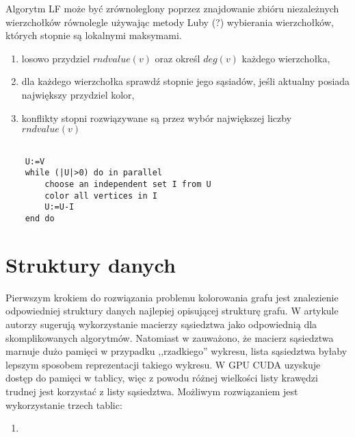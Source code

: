 \documentclass{article}
\begin{document}

	Algorytm LF może być zrównoleglony poprzez 	 znajdowanie zbióru niezależnych wierzchołków równolegle używając metody Luby (?) wybierania wierzchołków, których stopnie są lokalnymi maksymami.
  
	\begin{enumerate}
		\item losowo przydziel $rndvalue(v)$ oraz określ $deg(v)$ każdego wierzchołka,
		\item dla każdego wierzchołka sprawdź stopnie jego sąsiadów, jeśli aktualny posiada największy przydziel kolor,
		\item konflikty stopni rozwiązywane są przez wybór największej liczby $rndvalue(v)$
	\end{enumerate}
	\begin{lstlisting}
	
	U:=V
	while (|U|>0) do in parallel
		choose an independent set I from U
		color all vertices in I
		U:=U-I
	end do
	\end{lstlisting}
 
	\section{Struktury danych}
	Pierwszym krokiem do rozwiązania problemu kolorowania grafu jest znalezienie odpowiedniej struktury danych najlepiej opisującej strukturę grafu. W artykule \cite{Shen2017} autorzy sugerują wykorzystanie macierzy sąsiedztwa jako odpowiednią dla skomplikowanych algorytmów. Natomiast w \cite{SINGH20155} zauważono, że macierz sąsiedztwa marnuje dużo pamięci w przypadku ,,rzadkiego'' wykresu, lista sąsiedztwa byłaby lepszym sposobem reprezentacji takiego wykresu. W GPU CUDA uzyskuje dostęp do pamięci w tablicy, więc z powodu różnej wielkości listy krawędzi trudnej jest korzystać z listy sąsiedztwa. Możliwym rozwiązaniem jest wykorzystanie trzech tablic:
	\begin{enumerate}
		\item 
	\end{enumerate}
	
\end{document}

